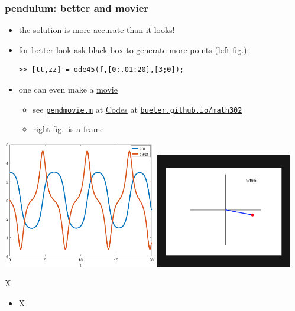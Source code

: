 \documentclass[urlcolor=blue,dvipsnames]{beamer}
\begin{document}
\begin{frame}[fragile]
\frametitle{pendulum: better and movier}

\small
\begin{itemize}
\item the solution is more accurate than it looks!
\item for better look ask black box to generate more points (left fig.):
\begin{Verbatim}[fontsize=\small]
>> [tt,zz] = ode45(f,[0:.01:20],[3;0]);
\end{Verbatim}
\item one can even make a \href{https://bueler.github.io/math302/assets/codes/pendmovie.gif}{movie}
    \begin{itemize}
    \item see \href{https://bueler.github.io/math302/assets/codes/pendmovie.m}{\texttt{pendmovie.m}} at \href{https://bueler.github.io/math302/codes.html}{Codes} at \href{https://bueler.github.io/math302/}{\texttt{bueler.github.io/math302}}
    \item right fig.~is a frame
    \end{itemize}
\end{itemize}

\includegraphics[width=0.5\textwidth]{figs/pend-smooth} \quad \includegraphics[width=0.45\textwidth]{figs/pend-snap}
\end{frame}


\begin{frame}{X}

\begin{itemize}
\item X
\end{itemize}
\end{frame}
\end{document}

